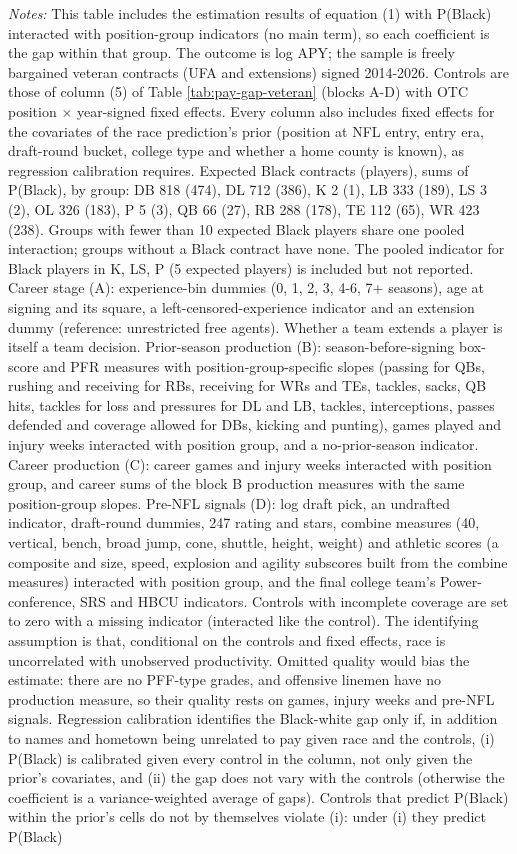 {\footnotesize
\noindent\textit{Notes:} This table includes the estimation results of equation (1) with P(Black) interacted with position-group indicators (no main term), so each coefficient is the gap within that group. The outcome is log APY; the sample is freely bargained veteran contracts (UFA and extensions) signed 2014-2026. Controls are those of column (5) of Table \ref{tab:pay-gap-veteran} (blocks A-D) with OTC position $\times$ year-signed fixed effects. Every column also includes fixed effects for the covariates of the race prediction's prior (position at NFL entry, entry era, draft-round bucket, college type and whether a home county is known), as regression calibration requires. Expected Black contracts (players), sums of P(Black), by group: DB 818 (474), DL 712 (386), K 2 (1), LB 333 (189), LS 3 (2), OL 326 (183), P 5 (3), QB 66 (27), RB 288 (178), TE 112 (65), WR 423 (238). Groups with fewer than 10 expected Black players share one pooled interaction; groups without a Black contract have none. The pooled indicator for Black players in K, LS, P (5 expected players) is included but not reported. Career stage (A): experience-bin dummies (0, 1, 2, 3, 4-6, 7+ seasons), age at signing and its square, a left-censored-experience indicator and an extension dummy (reference: unrestricted free agents). Whether a team extends a player is itself a team decision. Prior-season production (B): season-before-signing box-score and PFR measures with position-group-specific slopes (passing for QBs, rushing and receiving for RBs, receiving for WRs and TEs, tackles, sacks, QB hits, tackles for loss and pressures for DL and LB, tackles, interceptions, passes defended and coverage allowed for DBs, kicking and punting), games played and injury weeks interacted with position group, and a no-prior-season indicator. Career production (C): career games and injury weeks interacted with position group, and career sums of the block B production measures with the same position-group slopes. Pre-NFL signals (D): log draft pick, an undrafted indicator, draft-round dummies, 247 rating and stars, combine measures (40, vertical, bench, broad jump, cone, shuttle, height, weight) and athletic scores (a composite and size, speed, explosion and agility subscores built from the combine measures) interacted with position group, and the final college team's Power-conference, SRS and HBCU indicators. Controls with incomplete coverage are set to zero with a missing indicator (interacted like the control). The identifying assumption is that, conditional on the controls and fixed effects, race is uncorrelated with unobserved productivity. Omitted quality would bias the estimate: there are no PFF-type grades, and offensive linemen have no production measure, so their quality rests on games, injury weeks and pre-NFL signals. Regression calibration identifies the Black-white gap only if, in addition to names and hometown being unrelated to pay given race and the controls, (i) P(Black) is calibrated given every control in the column, not only given the prior's covariates, and (ii) the gap does not vary with the controls (otherwise the coefficient is a variance-weighted average of gaps). Controls that predict P(Black) within the prior's cells do not by themselves violate (i): under (i) they predict P(Black) }
